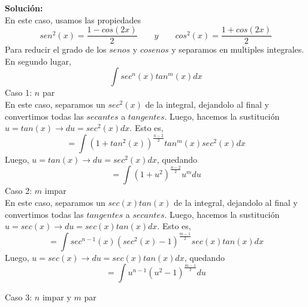 \documentclass[12pt]{article}
\newenvironment{solucion}
{\begin{mdframed}[backgroundcolor=black!10]
		{\bf Solución:}\\
	}
	{
	\end{mdframed}
}
\newenvironment{preguntas}
{\begin{enumerate}\itemsep12pt
	}
	{
	\end{enumerate}
}
\newcommand{\ra}{\rightarrow}
\begin{document}
\begin{preguntas}
\begin{solucion}
En este caso, usamos las propiedades
$$sen^2(x) = \dfrac{1-cos(2x)}{2} \qquad y \qquad cos^2(x) = \dfrac{1+cos(2x)}{2}$$
Para reducir el grado de los $senos$ y $cosenos$ y separamos en multiples integrales.\\

En segundo lugar,
$$\displaystyle\int sec^n(x)tan^m(x)dx$$
Caso 1: $n$ par\\

En este caso, separamos un $sec^2(x)$ de la integral, dejandolo al final y convertimos todas las $secantes$ a $tangentes$. Luego, hacemos la sustitución $u = tan(x) \ra du = sec^2(x)dx$. Esto es,
$$=\displaystyle\int (1+tan^2(x))^{\frac{n-2}{2}}tan^m(x)sec^2(x)dx$$
Luego, $u = tan(x) \ra du = sec^2(x)dx$, quedando
$$=\displaystyle\int (1+u^2)^{\frac{n-2}{2}}u^m du$$
Caso 2: $m$ impar\\

En este caso, separamos un $sec(x)tan(x)$ de la integral, dejandolo al final y convertimos todas las $tangentes$ a $secantes$. Luego, hacemos la sustitución $u = sec(x) \ra du = sec(x)tan(x)dx$. Esto es,
$$=\displaystyle\int sec^{n-1}(x)(sec^2(x) - 1)^{\frac{m-1}{2}}sec(x)tan(x)dx$$
Luego, $u = sec(x) \ra du = sec(x)tan(x)dx$, quedando
$$=\displaystyle\int u^{n-1}(u^2 - 1)^{\frac{m-1}{2}}du$$

Caso 3: $n$ impar y $m$ par\\


\end{solucion}
\end{preguntas}
\end{document}
